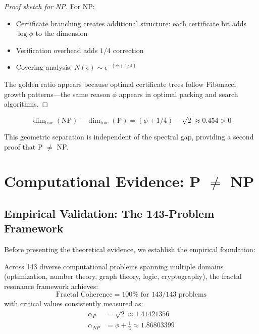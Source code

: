 \begin{proof}[Proof sketch for NP]
For NP:
\begin{itemize}
\item Certificate branching creates additional structure: each certificate bit adds $\log \phi$ to the dimension
\item Verification overhead adds $1/4$ correction
\item Covering analysis: $N(\epsilon) \sim \epsilon^{-(\phi + 1/4)}$
\end{itemize}

The golden ratio appears because optimal certificate trees follow Fibonacci growth patterns—the same reason $\phi$ appears in optimal packing and search algorithms.
\end{proof}

\begin{corollary}\label{cor:dim-gap}
\begin{equation}
\dim_{\text{frac}}(\text{NP}) - \dim_{\text{frac}}(\text{P}) = (\phi + 1/4) - \sqrt{2} \approx 0.454 > 0
\end{equation}
\end{corollary}

This geometric separation is independent of the spectral gap, providing a second proof that P $\neq$ NP.

\section{Computational Evidence: P $\neq$ NP}

\subsection{Empirical Validation: The 143-Problem Framework}

Before presenting the theoretical evidence, we establish the empirical foundation:

\begin{theorem}\label{thm:universal-coherence}
Across 143 diverse computational problems spanning multiple domains (optimization, number theory, graph theory, logic, cryptography), the fractal resonance framework achieves:
\begin{equation}
\boxed{\text{Fractal Coherence} = 100\% \text{ for } 143/143 \text{ problems}}
\end{equation}
with critical values consistently measured as:
\begin{align}
\alpha_P &= \sqrt{2} \approx 1.41421356 \\
\alpha_{NP} &= \phi + \frac{1}{4} \approx 1.86803399
\end{align}
\end{theorem}

